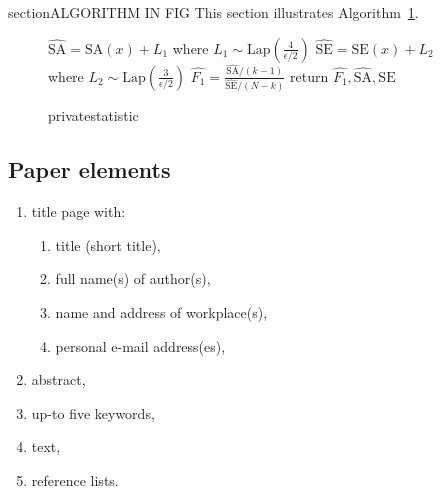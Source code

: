 \documentclass[USenglish,oneside,twocolumn]{article}
\begin{document}
section{ALGORITHM IN FIG}
This section illustrates Algorithm~\ref{alg:F1}.
\begin{figure}[h]
    \begin{algorithmic}
        \STATE $\widehat{\text{SA}} = \text{SA}(x) + L_1$ where $L_1\sim\text{Lap}\left(\frac{4}{\epsilon/2}\right)$ 
        \STATE $\widehat{\text{SE}} = \text{SE}(x) + L_2$ where $L_2\sim\text{Lap}\left(\frac{3}{\epsilon/2}\right)$
        \STATE  $\widehat{F_1} = \frac{\widehat{\text{SA}}/(k-1)}{\widehat{\text{SE}}/(N-k)}$
        \STATE return $\widehat{F_1}, \widehat{\text{SA}}, \widehat{\text{SE}}$
    \end{algorithmic}
        \caption{privatestatistic}
     \label{alg:F1}
\end{figure}


\subsection{Paper elements}

\begin{enumerate}
\item title page with:
    \begin{enumerate}
    \item title (short title),
    \item full name(s) of author(s),
    \item name and address of workplace(s),
    \item personal e-mail address(es),
    \end{enumerate}
\item abstract,
\item up-to five keywords,
\item text,
\item reference lists.
\end{enumerate}
\end{document}
